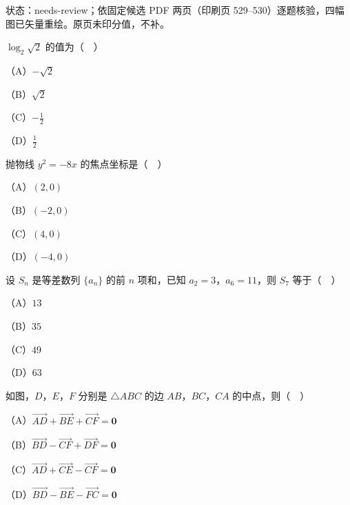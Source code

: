 

状态：needs-review；依固定候选 PDF 两页（印刷页 529–530）逐题核验，四幅图已矢量重绘。原页未印分值，不补。


\begin{question}
$\log_2\sqrt2$ 的值为（　）

（A）$-\sqrt2$

（B）$\sqrt2$

（C）$-\frac12$

（D）$\frac12$

\end{question}
\begin{question}
抛物线 $y^2=-8x$ 的焦点坐标是（　）

（A）$(2,0)$

（B）$(-2,0)$

（C）$(4,0)$

（D）$(-4,0)$

\end{question}
\begin{question}
设 $S_n$ 是等差数列 $\{a_n\}$ 的前 $n$ 项和，已知 $a_2=3$，$a_6=11$，则 $S_7$ 等于（　）

（A）$13$

（B）$35$

（C）$49$

（D）$63$

\Needspace{0.4\textheight}
\end{question}
\begingroup
\renewenvironment{question}{\Needspace{0.5\textheight}}{}
\begin{question}
如图，$D$，$E$，$F$ 分别是 $\triangle ABC$ 的边 $AB$，$BC$，$CA$ 的中点，则（　）

（A）$\overrightarrow{AD}+\overrightarrow{BE}+\overrightarrow{CF}=\boldsymbol 0$

（B）$\overrightarrow{BD}-\overrightarrow{CF}+\overrightarrow{DF}=\boldsymbol 0$

（C）$\overrightarrow{AD}+\overrightarrow{CE}-\overrightarrow{CF}=\boldsymbol 0$

（D）$\overrightarrow{BD}-\overrightarrow{BE}-\overrightarrow{FC}=\boldsymbol 0$
\nopagebreak[4]
\begin{center}\end{center}
\nopagebreak[4]
\end{question}
